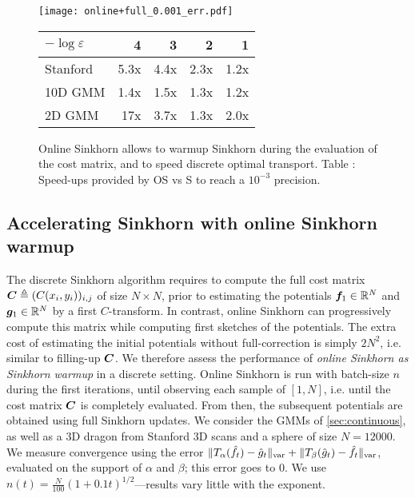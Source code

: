 \begin{figure}[t]
    \begin{widepage}
    \begin{minipage}{.7\linewidth}
    \texttt{[image: online+full\_0.001\_err.pdf]}
    \end{minipage}%
    \hfill
    \begin{minipage}{.3\linewidth}
        \centering
        \small
        \begin{tabular}{lrrrr}
            \toprule
            $- \log \varepsilon$
            &  4 & 3 & 2 & 1 \\
            \midrule
            Stanford      &     5.3x &    4.4x &    2.3x &    1.2x \\
            10D GMM     &     1.4x &    1.5x &    1.3x &    1.2x \\
            2D GMM      &    17x &    3.7x &    1.3x &    2.0x \\
            \bottomrule
            \end{tabular}
    \end{minipage}
    \end{widepage}
    \caption{Online Sinkhorn allows to warmup Sinkhorn during the evaluation of the cost matrix, and to speed discrete optimal transport. Table \thetable: Speed-ups provided by OS vs S to reach a $10^{-3}$ precision.}
    \label{fig:warmup}
    \vspace{-.8em}
\end{figure}


\subsection{Accelerating Sinkhorn with online Sinkhorn warmup}\label{sec:accelerating}

The discrete Sinkhorn algorithm requires to compute the full cost matrix $\bm{C}
\triangleq (C(x_i,y_i))_{i,j}$  of size $N \times N$, prior to estimating the
potentials $\bm{f}_1 \in \mathbb{R}^N$ and $\bm{g}_1 \in \mathbb{R}^N$ by a first $C$-transform. In
contrast, online Sinkhorn can progressively compute this matrix while computing
first sketches of the potentials. The extra cost of estimating the initial
potentials without full-correction is simply $2 N^2$, i.e. similar to filling-up
$\bm{C}$. We therefore assess the performance of \textit{online Sinkhorn as
Sinkhorn warmup} in a discrete setting. Online Sinkhorn is run with batch-size
$n$ during the first iterations, until observing each sample of $[1,N]$, i.e.
until the cost matrix $\bm{C}$ is completely evaluated. From then, the subsequent
potentials are obtained using full Sinkhorn updates. We consider the GMMs of
\autoref{sec:continuous}, as well as a 3D dragon from Stanford 3D scans
\cite{turk1994zippered} and a sphere of size $N=12000$. We measure convergence
using the error $\Vert T_{\alpha}(\hat f_t) - \hat g_t
\Vert_{\text{\upshape var}} + \Vert T_{\beta}(\hat g_t) - \hat f_t \Vert_{\text{\upshape var}}$,
evaluated on the support of $\alpha$ and $\beta$; this error goes to $0$. We use
$n(t) = \frac{N}{100} (1+0.1t)^{1/2}$---results vary little with the exponent.


